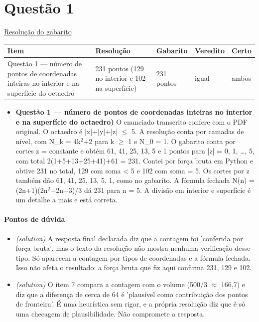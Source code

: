\documentclass{article}%
\begin{document}
\section*{Questão 1}%
\href{https://poliedroresolve.sistemapoliedro.com.br/vestibulares/ita/2026/ita-2-fase-dia-1-28-10-2025-2-fase-dia-1/dissertativa-1-matematica-2-fase-dia-1-ita-2026}{Resolução do gabarito}\par\smallskip%
\begin{longtable}{@{}p{} p{} p{} p{} p{}@{}}\toprule Item & Resolução & Gabarito & Veredito & Certo \\ \midrule
Questão 1 --- número de pontos de coordenadas inteiras no interior e na superfície do octaedro & 231 pontos (129 no interior e 102 na superfície) & 231 pontos & igual & ambos \\
\bottomrule\end{longtable}%
\begin{itemize}%
\item%
\textbf{Questão 1 --- número de pontos de coordenadas inteiras no interior e na superfície do octaedro)} O enunciado transcrito confere com o PDF original. O octaedro é |x|+|y|+|z| $\leq$ 5. A resolução conta por camadas de nível, com N\_k = 4k$^2$+2 para k $\geq$ 1 e N\_0 = 1. O gabarito conta por cortes z = constante e obtém 61, 41, 25, 13, 5 e 1 pontos para |z| = 0, 1, \ldots{}, 5, com total 2(1+5+13+25+41)+61 = 231. Contei por força bruta em Python e obtive 231 no total, 129 com soma < 5 e 102 com soma = 5. Os cortes por z também dão 61, 41, 25, 13, 5, 1, como no gabarito. A fórmula fechada N(n) = (2n+1)(2n$^2$+2n+3)/3 dá 231 para n = 5. A divisão em interior e superfície é um detalhe a mais e está correta.%
\end{itemize}%
\paragraph{Pontos de dúvida}%
\begin{itemize}%
\item%
\textit{(solution)} A resposta final declarada diz que a contagem foi 'conferida por força bruta', mas o texto da resolução não mostra nenhuma verificação desse tipo. Só aparecem a contagem por tipos de coordenadas e a fórmula fechada. Isso não afeta o resultado: a força bruta que fiz aqui confirma 231, 129 e 102.%
\item%
\textit{(solution)} O item 7 compara a contagem com o volume (500/3 $\approx$ 166,7) e diz que a diferença de cerca de 64 é 'plausível como contribuição dos pontos de fronteira'. É uma heurística sem rigor, e a própria resolução diz que é só uma checagem de plausibilidade. Não compromete a resposta.%
\end{itemize}%
\end{document}
